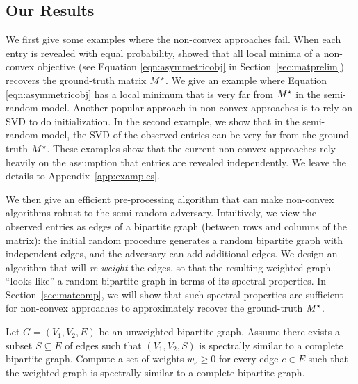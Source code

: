 \subsection{Our Results}
\label{sec:results}
%
%
%
%
%


We first give some examples where the non-convex approaches fail.
When each entry is revealed with equal probability, \cite{GeJZ17} showed that all local minima of a non-convex objective (see Equation \eqref{eqn:asymmetricobj} in Section~\ref{sec:matprelim}) recovers the ground-truth matrix $M^\star$. We give an example where Equation \eqref{eqn:asymmetricobj} has a local minimum that is very far from $M^\star$ in the semi-random model. Another popular approach in non-convex approaches is to rely on SVD to do initialization. In the second example, we show that in the semi-random model, the SVD of the observed entries can be very far from the ground truth $M^\star$. These examples show that the current non-convex approaches rely heavily on the assumption that entries are revealed independently. We leave the details to Appendix~\ref{app:examples}.

We then give an efficient pre-processing algorithm that can make non-convex algorithms robust to the semi-random adversary. Intuitively, we view the observed entries as edges of a bipartite graph (between rows and columns of the matrix): the initial random procedure generates a random bipartite graph with independent edges, and the adversary can add additional edges. We design an algorithm that will {\em re-weight} the edges, so that the resulting weighted graph ``looks like'' a random bipartite graph in terms of its spectral properties.
In Section~\ref{sec:matcomp}, we will show that such spectral properties are sufficient for non-convex approaches to approximately recover the ground-truth $M^\star$.

\begin{problem}
\label{prob:main}
Let $G = (V_1,V_2, E)$ be an unweighted bipartite graph. Assume there exists a subset $S \subseteq E$ of edges such that $(V_1,V_2, S)$ is spectrally similar to a complete bipartite graph. Compute a set of weights $w_e \ge 0$ for every edge $e\in E$ such that the weighted graph is spectrally similar to a complete bipartite graph.
\end{problem}

